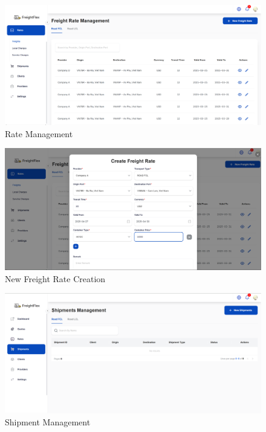 \begin{figure}[H]
    \centering
    \includegraphics[width=15cm]{graphics/UI/rate-management.png}
    \caption{Rate Management}
    \label{fig:rate-management}
\end{figure}

\begin{figure}[H]
    \centering
    \includegraphics[width=15cm]{graphics/UI/new-freight-rate.png}
    \caption{New Freight Rate Creation}
    \label{fig:new-freight-rate}
\end{figure}

\begin{figure}[H]
    \centering
    \includegraphics[width=15cm]{graphics/UI/shipment-management.png}
    \caption{Shipment Management}
    \label{fig:shipment-management}
\end{figure}

